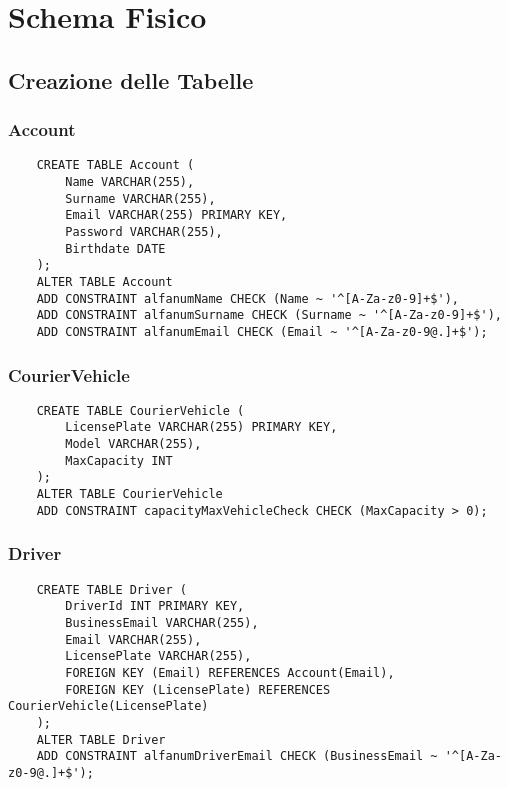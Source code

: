 \section{Schema Fisico}

\subsection{Creazione delle Tabelle}

\subsubsection{Account}

\begin{lstlisting}
    CREATE TABLE Account (
        Name VARCHAR(255),
        Surname VARCHAR(255),
        Email VARCHAR(255) PRIMARY KEY,
        Password VARCHAR(255),
        Birthdate DATE
    );
	ALTER TABLE Account
    ADD CONSTRAINT alfanumName CHECK (Name ~ '^[A-Za-z0-9]+$'),
    ADD CONSTRAINT alfanumSurname CHECK (Surname ~ '^[A-Za-z0-9]+$'),
    ADD CONSTRAINT alfanumEmail CHECK (Email ~ '^[A-Za-z0-9@.]+$');
\end{lstlisting}

\subsubsection{CourierVehicle}

\begin{lstlisting}
    CREATE TABLE CourierVehicle (
        LicensePlate VARCHAR(255) PRIMARY KEY,
        Model VARCHAR(255),
        MaxCapacity INT
    );
    ALTER TABLE CourierVehicle
    ADD CONSTRAINT capacityMaxVehicleCheck CHECK (MaxCapacity > 0);
\end{lstlisting}

\subsubsection{Driver}

\begin{lstlisting}
    CREATE TABLE Driver (
        DriverId INT PRIMARY KEY,
        BusinessEmail VARCHAR(255),
        Email VARCHAR(255),
        LicensePlate VARCHAR(255),
        FOREIGN KEY (Email) REFERENCES Account(Email),
        FOREIGN KEY (LicensePlate) REFERENCES CourierVehicle(LicensePlate)
    );
    ALTER TABLE Driver
    ADD CONSTRAINT alfanumDriverEmail CHECK (BusinessEmail ~ '^[A-Za-z0-9@.]+$');
\end{lstlisting}

